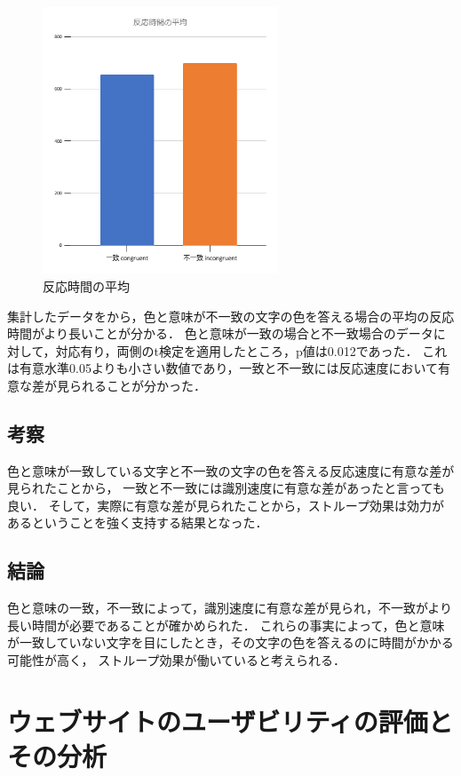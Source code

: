\documentclass[titlepage]{jlreq}
\begin{document}
\begin{figure}
    \includegraphics[width=7cm]{respons_speed.png}
    \centering
    \caption{反応時間の平均}
\end{figure}

集計したデータをから，色と意味が不一致の文字の色を答える場合の平均の反応時間がより長いことが分かる．
色と意味が一致の場合と不一致場合のデータに対して，対応有り，両側のt検定を適用したところ，p値は0.012であった．
これは有意水準0.05よりも小さい数値であり，一致と不一致には反応速度において有意な差が見られることが分かった．


\subsection{考察}

色と意味が一致している文字と不一致の文字の色を答える反応速度に有意な差が見られたことから，
一致と不一致には識別速度に有意な差があったと言っても良い．
そして，実際に有意な差が見られたことから，ストループ効果は効力があるということを強く支持する結果となった．

\subsection{結論}
色と意味の一致，不一致によって，識別速度に有意な差が見られ，不一致がより長い時間が必要であることが確かめられた．
これらの事実によって，色と意味が一致していない文字を目にしたとき，その文字の色を答えるのに時間がかかる可能性が高く，
ストループ効果が働いていると考えられる．




\section{ウェブサイトのユーザビリティの評価とその分析}
\end{document}
